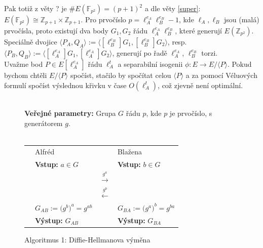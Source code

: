 \documentclass [12pt]{report}
\begin{document}
Pak totiž z věty ? je $\#E(\mathbb{F}_{p^2}) = (p+1)^2$ a dle věty \ref{super}: $E(\mathbb{F}_{p^2}) \cong \mathbb{Z}_{p+1} \times \mathbb{Z}_{p+1}$. Pro prvočíslo $p = \ell_A ^{e_A} \ell_B ^{e_B} - 1$, kde $\ell_A,\ell_B$ jsou (malá) prvočísla, proto existují dva body $G_1,G_2$ řádu $\ell_A ^{e_A} \ell_B ^{e_B}$, které generují $E(\mathbb{Z}_{p^2})$. Speciálně dvojice $\langle P_A, Q_A \rangle := \langle [\ell_B ^{e_B}]G_1, [\ell_B ^{e_B}]G_2 \rangle$, resp. $\langle P_B, Q_B \rangle := \langle  [\ell_A ^{e_A}]G_1, [\ell_A ^{e_A}]G_2 \rangle$, generují po řadě $\ell_A ^{e_A}$, $\ell_B ^{e_B}$ torzi.\\

Uvažme bod $P \in E[\ell_A ^{e_A}]$ řádu $\ell_A  ^t$ a separabilní isogenii $\phi : E \longrightarrow E/\langle P \rangle$. Pokud bychom chtěli $E/\langle P \rangle$ spočíst, stačilo by spočítat celou $\langle P \rangle$ a za pomocí Véluových formulí spočíst výslednou křivku v čase $O(\ell_A  ^t)$, což zjevně není optimální.

\begin{figure}[h]
\begin{center} 
\makebox[1cm]{\rule{15cm}{0.4pt}}\\
\hspace{-1.35cm} \textbf{Veřejné parametry:} Grupa $G$ řádu $p$, kde $p$ je prvočíslo, s generátorem $g$.\\

\vspace{-0.25cm}
\makebox[\linewidth]{\rule{15cm}{0.4pt}}\\
\vspace{0.2cm}
\begin{tabular}{l l c l}
\cline{2-2} \cline{4-4} 
& Alfréd & & Blažena \\ 
\cline{2-2} \cline{4-4} 
& \textbf{Vstup:} $a \in G$ & & \textbf{Vstup:} $b \in G$ \\
 & & $\stackrel{g^a}{\longrightarrow} $ &  \\
&  & $\stackrel{g^b}{\longleftarrow} $ &  \\
& $G_{AB} := \big(g^b\big)^{a} = g^{ab}$ &  & $ G_{BA} := \big(g^a\big)^{b} = g^{ba}$ \\
& \textbf{Výstup:} $G_{AB}$ & & \textbf{Výstup:} $G_{BA}$
\end{tabular}
\caption*{Algoritmus 1: Diffie-Hellmanova výměna}
\vspace{-0.8cm}
\end{center}
\end{figure}
\end{document}
